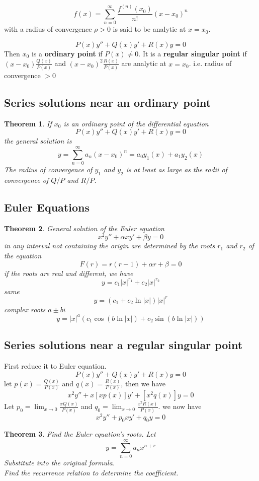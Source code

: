 \documentclass[letter]{article}
\newtheorem{theorem}{Theorem}[section]
\newenvironment{definition}[1][Definition]{\begin{trivlist}
\item[\hskip \labelsep {\bfseries #1}]}{\end{trivlist}}
\begin{document}
\begin{definition}
\[
f(x) = \sum_{n=0}^\infty \frac{f^{(n)}(x_0)}{n!}(x-x_0)^n
\]
with a radius of convergence $\rho > 0$ is said to be analytic at $x=x_0$.
\end{definition}

\begin{definition}
\[
P(x)y''+Q(x)y'+R(x)y = 0
\]
Then $x_0$ is a \textbf{ordinary point} if $P(x)\neq 0$. It is a \textbf{regular singular point} if
$(x - x_0) \frac{Q(x)}{P(x)}$ and $(x-x_0)^2 \frac{R(x)}{P(x)}$ are analytic at $x = x_0$. i.e. radius of convergence $>0$

\subsection{Series solutions near an ordinary point}
\begin{theorem}
If $x_0$ is an ordinary point of the differential equation
\[
P(x)y''+Q(x)y'+R(x)y=0
\]
the general solution is
\[
y = \sum_{n=0}^\infty a_n(x-x_0)^n = a_0 y_1(x) + a_1 y_2(x)
\]
The radius of convergence of $y_1$ and $y_2$ is at least as large as the radii of convergence of $Q/P$ and $R/P$.
\end{theorem}

\subsection{Euler Equations}
\begin{theorem}
General solution of the Euler equation
\[
x^2 y'' + \alpha xy' + \beta y=0
\]
in any interval not containing the origin are determined by the roots $r_1$ and $r_2$ of the equation
\[
F(r)=r(r-1)+\alpha r + \beta = 0
\]
if the roots are real and different, we have
\[
y = c_1 |x|^{r_1} + c_2 |x|^{r_2}
\]
same
\[
y = (c_1+c_2 \ln|x|)|x|^{r}
\]
complex roots $a\pm bi$
\[
y = |x|^a (c_1 \cos(b \ln|x|) + c_2 \sin(b \ln |x|))
\]
\end{theorem}

\subsection{Series solutions near a regular singular point}
First reduce it to Euler equation.
\[
P(x)y''+Q(x)y'+R(x)y = 0
\]
let $p(x) = \frac{Q(x)}{P(x)}$ and $q(x) = \frac{R(x)}{P(x)}$, then we have
\[
x^2y''+x[xp(x)]y'+[x^2q(x)]y=0
\]
Let $p_0 = \lim_{x\to 0} \frac{xQ(x)}{P(x)}$ and $q_0 = \lim_{x\to 0} \frac{x^2R(x)}{P(x)}$.
we now have
\[
x^2y''+p_0xy'+q_0y=0
\]
\begin{theorem}
Find the Euler equation's roots.
Let
\[
y = \sum_{n=0}^{\infty} a_n x^{n+r}
\]
Substitute into the original formula.\\
Find the recurrence relation to determine the coefficient.\\



\end{theorem}
\end{definition}
\end{document}

